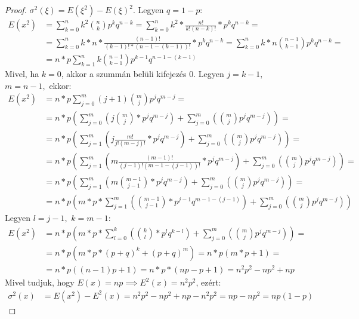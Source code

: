 \documentclass[twoside,12pt]{report}
\theoremstyle{definition}
\begin{document}
	\begin{proof}
		$\sigma^2(\xi)=E(\xi^2)-E(\xi)^2$. Legyen $q=1-p$:
		\begin{align*}
			E(x^2)&=\sum_{k=0}^n k^2\binom{n}{k}p^kq^{n-k}=
			\sum_{k=0}^{n}k^2*\frac{n!}{k!(n-k)!}*p^kq^{n-k}=\\
			&=\sum_{k=0}^{n}k*n*\frac{(n-1)!}{(k-1)!*(n-1-(k-1))!}*p^kq^{n-k}=\sum_{k=0}^n k*n\binom{n-1}{k-1}p^kq^{n-k}=\\
			&=n*p\sum_{k=1}^nk\binom{n-1}{k-1}p^{k-1}q^{n-1-(k-1)}
		\end{align*}
		Mivel, ha $k=0$, akkor a szummán belüli kifejezés 0. Legyen $j=k-1,$ $m=n-1,$ ekkor:
		\begin{align*}
			E(x^2)&=n*p\sum_{j=0}^{m}(j+1)\binom{m}{j}p^jq^{m-j}=\\
			&=n*p\left(\sum_{j=0}^{m} \left(j\binom{m}{j}*p^jq^{m-j}\right)+ \sum_{j=0}^{m}\left(\binom{m}{j}p^jq^{m-j}\right)\right)=\\
			&=n*p\left(\sum_{j=1}^{m} \left(j\frac{m!}{j!(m-j)!}*p^jq^{m-j}\right)+ \sum_{j=0}^{m}\left(\binom{m}{j}p^jq^{m-j}\right)\right)=\\
			&=n*p\left(\sum_{j=1}^{m} \left(m\frac{(m-1)!}{(j-1)!(m-1-(j-1))!}*p^jq^{m-j}\right)+ \sum_{j=0}^{m}\left(\binom{m}{j}p^jq^{m-j}\right)\right)=\\
			&=n*p\left(\sum_{j=1}^{m} \left(m\binom{m-1}{j-1}*p^jq^{m-j}\right)+ \sum_{j=0}^{m}\left(\binom{m}{j}p^jq^{m-j}\right)\right)=\\
			&=n*p\left(m*p*\sum_{j=1}^{m}\left(\binom{m-1}{j-1}*p^{j-1}q^{m-1-(j-1)}\right)+ \sum_{j=0}^{m}\left(\binom{m}{j}p^jq^{m-j}\right)\right)
		\end{align*}
		Legyen $l=j-1,$ $k=m-1$:
		\begin{align*}
			E(x^2)&=n*p\left(m*p*\sum_{l=0}^{k}\left(\binom{k}{l}*p^{l}q^{k-l}\right)+ \sum_{j=0}^{m}\left(\binom{m}{j}p^jq^{m-j}\right)\right)=\\
			&=n*p\left(m*p*(p+q)^k+(p+q)^m\right)=n*p(m*p+1)=\\
			&=n*p((n-1)p+1)=n*p*(np-p+1)=n^2p^2-np^2+np
		\end{align*}
		Mivel tudjuk, hogy $E(x)=np\implies E^2(x)=n^2p^2$, ezért:
		\begin{align*}
			\sigma^2(x)&=E(x^2)-E^2(x)=n^2p^2-np^2+np-n^2p^2=np-np^2=np(1-p)
		\end{align*}
	\end{proof}
\end{document}
